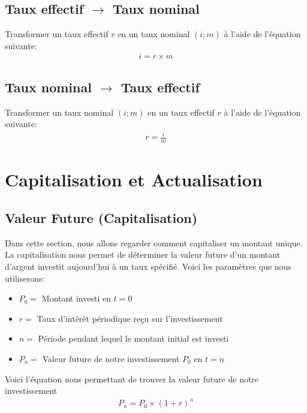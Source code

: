 \documentclass[letterpaper, 12pt]{article}
\newcommand{\1}{\mathds{1}}	%
\theoremstyle{definition}
\begin{document}
\subsection{Taux effectif $\rightarrow$ Taux nominal}
Transformer un taux effectif $r$ en un taux nominal $(i;m)$ à l'aide de l'équation suivante:
\begin{align*}
i = r \times m
\end{align*}

\subsection{Taux nominal $\rightarrow$ Taux effectif}
Transformer un taux nominal $(i;m)$ en un taux effectif $r$ à l'aide de l'équation suivante:
\begin{align*}
r=\frac{i}{m}
\end{align*}

\pagebreak \newpage

\section{Capitalisation et Actualisation}
\subsection{Valeur Future (Capitalisation)}
Dans cette section, nous allons regarder comment capitaliser un montant unique. La capitalisation nous permet de déterminer la valeur future d'un montant d'argent investit aujourd'hui à un taux spécifié. Voici les paramètres que nous utiliserons:
\begin{itemize}
\item $P_0=$ Montant investi en $t=0$ 
\item $r=$ Taux d'intérêt périodique reçu sur l'investissement
\item $n=$ Période pendant lequel le montant initial est investi
\item $P_n=$ Valeur future de notre investissement $P_0$ en $t=n$
\end{itemize}

Voici l'équation nous permettant de trouver la valeur future de notre investissement 
\begin{align*}
P_n=P_0 \times (1+r)^n
\end{align*}
\end{document}
